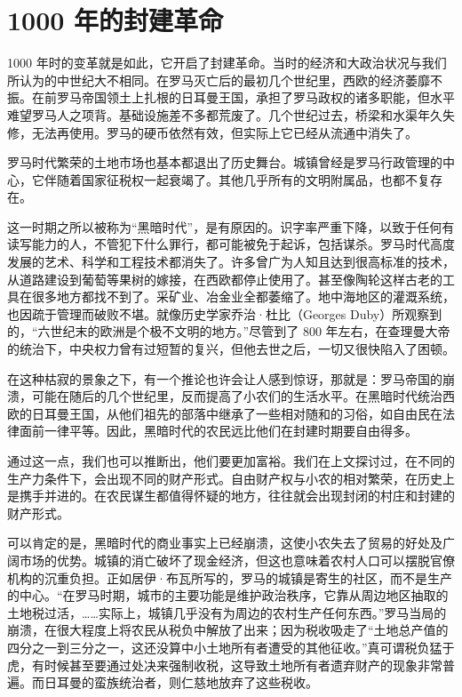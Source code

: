 \section{1000 年的封建革命}
1000 年时的变革就是如此，它开启了封建革命。当时的经济和大政治状况与我们所认为的中世纪大不相同。在罗马灭亡后的最初几个世纪里，西欧的经济萎靡不振。在前罗马帝国领土上扎根的日耳曼王国，承担了罗马政权的诸多职能，但水平难望罗马人之项背。基础设施差不多都荒废了。几个世纪过去，桥梁和水渠年久失修，无法再使用。罗马的硬币依然有效，但实际上它已经从流通中消失了。

罗马时代繁荣的土地市场也基本都退出了历史舞台。城镇曾经是罗马行政管理的中心，它伴随着国家征税权一起衰竭了。其他几乎所有的文明附属品，也都不复存在。

这一时期之所以被称为“黑暗时代”，是有原因的。识字率严重下降，以致于任何有读写能力的人，不管犯下什么罪行，都可能被免于起诉，包括谋杀。罗马时代高度发展的艺术、科学和工程技术都消失了。许多曾广为人知且达到很高标准的技术，从道路建设到葡萄等果树的嫁接，在西欧都停止使用了。甚至像陶轮这样古老的工具在很多地方都找不到了。采矿业、冶金业全都萎缩了。地中海地区的灌溉系统，也因疏于管理而破败不堪。就像历史学家乔治·杜比（Georges Duby）所观察到的，“六世纪末的欧洲是个极不文明的地方。”尽管到了 800 年左右，在查理曼大帝的统治下，中央权力曾有过短暂的复兴，但他去世之后，一切又很快陷入了困顿。

在这种枯寂的景象之下，有一个推论也许会让人感到惊讶，那就是：罗马帝国的崩溃，可能在随后的几个世纪里，反而提高了小农们的生活水平。在黑暗时代统治西欧的日耳曼王国，从他们祖先的部落中继承了一些相对随和的习俗，如自由民在法律面前一律平等。因此，黑暗时代的农民远比他们在封建时期要自由得多。

通过这一点，我们也可以推断出，他们要更加富裕。我们在上文探讨过，在不同的生产力条件下，会出现不同的财产形式。自由财产权与小农的相对繁荣，在历史上是携手并进的。在农民谋生都值得怀疑的地方，往往就会出现封闭的村庄和封建的财产形式。

可以肯定的是，黑暗时代的商业事实上已经崩溃，这使小农失去了贸易的好处及广阔市场的优势。城镇的消亡破坏了现金经济，但这也意味着农村人口可以摆脱官僚机构的沉重负担。正如居伊·布瓦所写的，罗马的城镇是寄生的社区，而不是生产的中心。“在罗马时期，城市的主要功能是维护政治秩序，它靠从周边地区抽取的土地税过活，……实际上，城镇几乎没有为周边的农村生产任何东西。”罗马当局的崩溃，在很大程度上将农民从税负中解放了出来；因为税收吸走了“土地总产值的四分之一到三分之一，这还没算中小土地所有者遭受的其他征收。”真可谓税负猛于虎，有时候甚至要通过处决来强制收税，这导致土地所有者遗弃财产的现象非常普遍。而日耳曼的蛮族统治者，则仁慈地放弃了这些税收。

